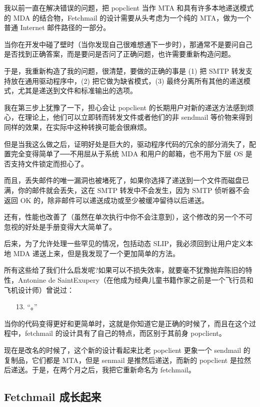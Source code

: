 我以前一直在解决错误的问题，把 popclient 当作 MTA 和具有许多本地递送模式的 MDA 的结合物，Fetchmail 的设计需要从头考虑为一个纯的 MTA，做为一个普通 Internet 邮件路径的一部分。


当你在开发中碰了壁时（当你发现自己很难想通下一步时），那通常不是要问自己是否找到正确答案，而是要问是否问了正确问题，也许需要重新构造问题。


于是，我重新构造了我的问题，很清楚，要做的正确的事是 (1) 把 SMTP 转发支持放在通用驱动程序中，(2) 把它做为缺省模式，(3) 最终分离所有其他的递送模式，尤其是递送到文件和标准输出的选项。


我在第三步上犹豫了一下，担心会让 popclient 的长期用户对新的递送方法感到烦心，在理论上，他们可以立即转而转发文件或者他们的非 sendmail 等价物来得到同样的效果，在实际中这种转换可能会很麻烦。

但是当我这么做之后，证明好处是巨大的，驱动程序代码的冗余的部分消失了，配置完全变得简单了──不用屈从于系统 MDA 和用户的邮箱，也不用为下层 OS 是否支持文件锁定而担心了。


而且，丢失邮件的唯一漏洞也被堵死了，如果你选择了递送到一个文件而磁盘已满，你的邮件就会丢失，这在 SMTP 转发中不会发生，因为 SMTP 侦听器不会返回 OK 的，除非邮件可以递送成功或至少被缓冲留待以后递送。


还有，性能也改善了（虽然在单次执行中你不会注意到），这个修改的另一个不可忽视的好处是手册变得大大简单了。


后来，为了允许处理一些罕见的情况，包括动态 SLIP，我必须回到让用户定义本地 MDA 递送上来，但是我发现了一个更加简单的方法。


所有这些给了我们什么启发呢?如果可以不损失效率，就要毫不犹豫抛弃陈旧的特性，Antonine de SaintExupery（在他成为经典儿童书籍作家之前是一个飞行员和飞机设计师）曾说过：

\begin{enumerate}
\item[13.] “。”
\end{enumerate}

当你的代码变得更好和更简单时，这就是你知道它是正确的时候了，而且在这个过程中，fetchmail 的设计具有了自己的特点，而区别于其前身 popclient。


现在是改名的时候了，这个新的设计看起来比老 popclient 更象一个 sendmail 的复制品，它们都是 MTA，但是 senmail 是推然后递送，而新的 popclient 是拉然后递送。于是，在两个月之后，我把它重新命名为 fetchmail。


\subsection{Fetchmail 成长起来}


